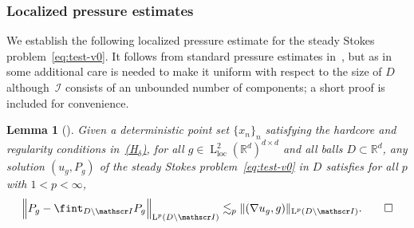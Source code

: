 \documentclass[10pt]{amsart}
\let\mathcal\mathscr
\newcommand{\Hd}{\hyperref[Hd]{\textup{(H$_\delta$)}}\xspace}
\theoremstyle{plain}
\newtheorem{lem}[theor]{Lemma}
\theoremstyle{definition}
\newcommand{\R}{\mathbb R}
\newcommand{\Ic}{\mathcal I}
\newcommand{\loc}{{\operatorname{loc}}}
\newcommand{\Ld}{\operatorname{L}}
\begin{document}
\subsubsection{Localized pressure estimates}
We establish the following localized pressure estimate for the steady Stokes problem~\eqref{eq:test-v0}.
It follows from standard pressure esti\-mates in~\cite{Galdi}, but as in~\cite[Proof of Prop.\,2.1]{DG-19} some additional care is needed to make it uniform with respect to the size of $D$ although~$\Ic$ consists of an unbounded number of components; a short proof is included for convenience.

\begin{lem}[\cite{Galdi,DG-19}]\label{lem:pres}
Given a deterministic point set $\{x_{n}\}_n$ satisfying the hardcore and regularity conditions in~\Hd, for all $g\in \Ld^2_\loc(\R^d)^{d\times d}$ and all balls $D\subset\R^d$, any solution $(u_g,P_g)$ of the steady Stokes problem~\eqref{eq:test-v0} in $D$ satisfies for all $p$ with $1<p<\infty$,
\begin{equation*}
\Big\|P_g-\fint_{D\setminus\Ic}P_g\Big\|_{\Ld^p(D\setminus\Ic)}\lesssim_p \|(\nabla u_g,g)\|_{\Ld^p(D\setminus\Ic)}.\qedhere
\end{equation*}
\end{lem}
\end{document}
